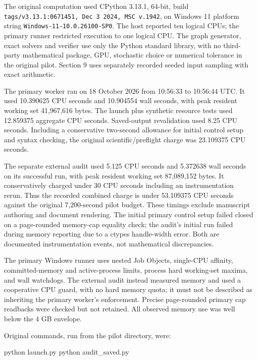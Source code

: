 \documentclass[
]{article}
\newenvironment{Shaded}{}{}
\newcommand{\FunctionTok}[1]{\textcolor[rgb]{0.02,0.16,0.49}{#1}}
\newcommand{\NormalTok}[1]{#1}
\newcommand{\OperatorTok}[1]{\textcolor[rgb]{0.40,0.40,0.40}{#1}}
\begin{document}
The original computation used CPython 3.13.1, 64-bit, build
\texttt{tags/v3.13.1:0671451,\ Dec\ 3\ 2024,\ MSC\ v.1942}, on Windows
11 platform string \texttt{Windows-11-10.0.26100-SP0}. The host reported
ten logical CPUs; the primary runner restricted execution to one logical
CPU. The graph generator, exact solvers and verifier use only the Python
standard library, with no third-party mathematical package, GPU,
stochastic choice or numerical tolerance in the original pilot. Section
9 uses separately recorded seeded input sampling with exact arithmetic.

The primary worker ran on 18 October 2026 from 10:56:33 to 10:56:44 UTC.
It used 10.390625 CPU seconds and 10.904554 wall seconds, with peak
resident working set 41,967,616 bytes. The launch plus synthetic
resource tests used 12.859375 aggregate CPU seconds. Saved-output
revalidation used 8.25 CPU seconds. Including a conservative two-second
allowance for initial control setup and syntax checking, the original
scientific/preflight charge was 23.109375 CPU seconds.

The separate external audit used 5.125 CPU seconds and 5.372638 wall
seconds on its successful run, with peak resident working set 87,089,152
bytes. It conservatively charged under 30 CPU seconds including an
instrumentation rerun. Thus the recorded combined charge is under
53.109375 CPU seconds against the original 7,200-second pilot budget.
These timings exclude manuscript authoring and document rendering. The
initial primary control setup failed closed on a page-rounded memory-cap
equality check; the audit's initial run failed during memory reporting
due to a ctypes handle-width error. Both are documented instrumentation
events, not mathematical discrepancies.

The primary Windows runner uses nested Job Objects, single-CPU affinity,
committed-memory and active-process limits, process hard working-set
maxima, and wall watchdogs. The external audit instead measured memory
and used a cooperative CPU guard, with no hard memory quota; it must not
be described as inheriting the primary worker's enforcement. Precise
page-rounded primary cap readbacks were checked but not retained. All
observed memory use was well below the 4 GB envelope.

Original commands, run from the pilot directory, were:

\begin{Shaded}
\begin{Highlighting}[]
\NormalTok{python launch}\OperatorTok{.}\FunctionTok{py}
\NormalTok{python audit\_saved}\OperatorTok{.}\FunctionTok{py}
\end{Highlighting}
\end{Shaded}
\end{document}
